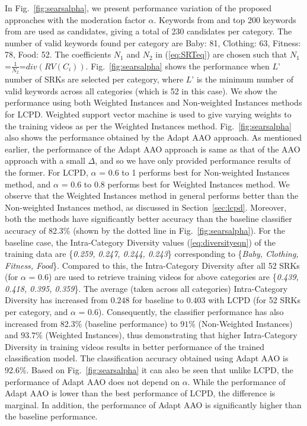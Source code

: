 In Fig.~\ref{fig:searsalpha}, we present performance variation of the proposed approaches with the moderation factor $\alpha$. Keywords from \cite{nakayama2007wikipedia} and top 200 keywords from \cite{ReverseDictionary}  are used as candidates, giving a total of 230 candidates per category. The number of valid keywords found per category are Baby: 81, Clothing: 63, Fitness: 78, Food: 52. The coefficients $N_1$ and $N_2$ in (\ref{eq:SRTeq}) are chosen such that $N_1$=$\frac{1}{N_2}$=$div(RV(C_i))$. Fig.~\ref{fig:searsalpha} shows the performance when $L$' number of SRKs are selected per category, where $L$' is the minimum number of valid keywords across all categories (which is 52 in this case). We show the performance using both Weighted Instances and Non-weighted Instances methods for LCPD. Weighted support vector machine \cite{yang2007weighted} is used to give varying weights to the training videos as per the Weighted Instances method. Fig.~\ref{fig:searsalpha} also shows the performance obtained by the Adapt AAO approach. As mentioned earlier, the performance of the Adapt AAO approach is same as that of the AAO approach with a small $\Delta$, and so we have only provided performance results of the former. For LCPD, $\alpha$ = 0.6 to 1 performs best for Non-weighted Instances method, and $\alpha$ = 0.6 to 0.8 performs best for Weighted Instances method. We observe that the Weighted Instances method in general performs better than the Non-weighted Instances method, as discussed in Section~\ref{sec:lcpd}. Moreover, both the methods have significantly better accuracy than the baseline classifier accuracy of 82.3\% (shown by the dotted line in Fig.~\ref{fig:searsalpha}). For the baseline case, the Intra-Category Diversity values (\ref{eq:diversityeqn}) of the training data are  \{\textit{0.259, 0.247, 0.244, 0.243}\} corresponding to \{\textit{Baby, Clothing, Fitness, Food}\}. Compared to this, the Intra-Category Diversity after all 52 SRKs (for $\alpha$ = 0.6) are used to retrieve training videos for above categories are \{\textit{0.439, 0.418, 0.395, 0.359}\}. The average (taken across all categories) Intra-Category Diversity has increased from $0.248$ for baseline to $0.403$ with LCPD (for 52 SRKs per category, and $\alpha$ = 0.6). Consequently, the classifier performance has also increased from 82.3\% (baseline performance) to $91$\% (Non-Weighted Instances) and $93.7$\% (Weighted Instances), thus demonstrating that higher Intra-Category Diversity in training videos results in better performance of the trained classification model. The classification accuracy obtained using Adapt AAO is 92.6\%. Based on Fig.~\ref{fig:searsalpha} it can also be seen that unlike LCPD, the performance of Adapt AAO does not depend on $\alpha$. While the performance of Adapt AAO is lower than the best performance of LCPD, the difference is marginal. In addition, the performance of Adapt AAO is significantly higher than the baseline performance. 

